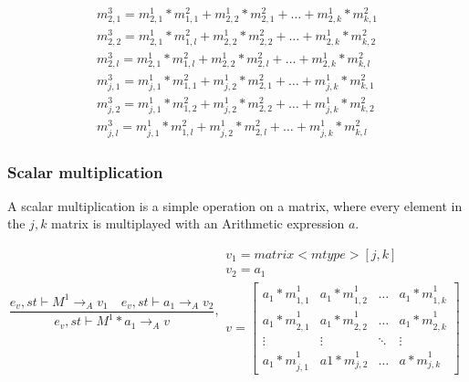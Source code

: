 \begin{minipage}{1.0\textwidth}
\begin{equation*}
\begin{aligned}
{ { m }_{ 2,1 }^{ 3 } }  = { { m }_{ 2,1 }^{ 1 } } *{ { m }_{ 1,1 }^{ 2 } }+ { { m }_{ 2,2 }^{ 1 } } *{ { m }_{ 2,1 }^{ 2 } }+\dots+ { { m }_{ 2,k }^{ 1 } } *{ { m }_{ k,1 }^{ 2 } }\\
{ { m }_{ 2,2 }^{ 3 } }  = { { m }_{ 2,1 }^{ 1 } } *{ { m }_{ 1,l }^{ 2 } }+ { { m }_{ 2,2 }^{ 1 } } *{ { m }_{ 2,2 }^{ 2 } }+\dots+ { { m }_{ 2,k }^{ 1 } } *{ { m }_{ k,2 }^{ 2 } }\\
{ { m }_{ 2,l }^{ 3 } }  = { { m }_{ 2,1 }^{ 1 } } *{ { m }_{ 1,l }^{ 2 } }+ { { m }_{ 2,2 }^{ 1 } } *{ { m }_{ 2,l }^{ 2 } }+\dots+ { { m }_{ 2,k }^{ 1 } } *{ { m }_{ k,l }^{ 2 } }\\
{ { m }_{ j,1 }^{ 3 } }  = { { m }_{ j,1 }^{ 1 } } *{ { m }_{ 1,1 }^{ 2 } }+ { { m }_{ j,2 }^{ 1 } } *{ { m }_{ 2,1 }^{ 2 } }+\dots+ { { m }_{ j,k }^{ 1 } } *{ { m }_{ k,1 }^{ 2 } }\\
{ { m }_{ j,2 }^{ 3 } }  = { { m }_{ j,1 }^{ 1 } } *{ { m }_{ 1,2 }^{ 2 } }+ { { m }_{ j,2 }^{ 1 } } *{ { m }_{ 2,2 }^{ 2 } }+\dots+ { { m }_{ j,k }^{ 1 } } *{ { m }_{ k,2 }^{ 2 } }\\
{ { m }_{ j,l }^{ 3 } }  = { { m }_{ j,1 }^{ 1 } } *{ { m }_{ 1,l }^{ 2 } }+ { { m }_{ j,2 }^{ 1 } } *{ { m }_{ 2,l }^{ 2 } }+\dots+ { { m }_{ j,k }^{ 1 } } *{ { m }_{ k,l }^{ 2 } }
\end{aligned}
\end{equation*}
\end{minipage}
\subsubsection{Scalar multiplication}
A scalar multiplication is a simple operation on a matrix, where every element in the $j,k$ matrix is multiplayed with an Arithmetic expression $a$. 

\begin{equation}
	\frac { { e }_{ v },st\vdash { M }^{ 1 }{ \rightarrow  }_{ A }{ v }_{ 1 }\quad { e }_{ v },st\vdash { a }_{ 1 }{ \rightarrow  }_{ A }{ v }_{ 2 } }{ { e }_{ v },st\vdash { M }^{ 1 }\ast { a }_{ 1 }{ \rightarrow_{ A }}{ v } } ,\begin{matrix} { v }_{ 1 }=matrix<mtype>[j,k] \\ { v }_{ 2 }={ a }_{ 1 } \\ v=\begin{bmatrix} { { a }_{ 1 }*m }_{ 1,1 }^{ 1 } & { { a }_{ 1 }*m }_{ 1,2 }^{ 1 } & \dots  & { { a }_{ 1 }*m }_{ 1,k }^{ 1 } \\
 { { a }_{ 1 }*m }_{ 2,1 }^{ 1 } & { { a }_{ 1 }*m }_{ 2,2 }^{ 1 } & \dots  & { { a }_{ 1 }*m }_{ 2,k }^{ 1 }  \\ \vdots & \vdots & \ddots & \vdots \\ { { a }_{ 1 }*m }_{ j,1 }^{ 1 } & { a 1*m }_{ j,2 }^{ 1 } & \dots & {a *m }_{ j,k }^{ 1 } \end{bmatrix} \end{matrix}
\end{equation}

